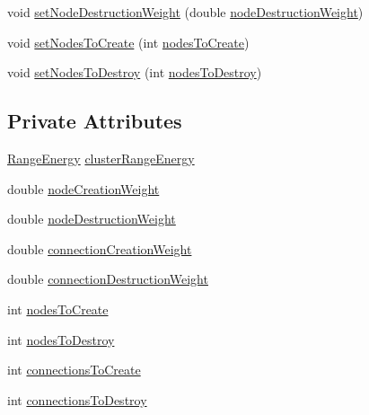 \begin{DoxyCompactItemize}
\item 
void \hyperlink{classcryomesh_1_1manipulators_1_1ClusterAnalysisData_a6bbc3f1089e480e644517c01e119cc56}{set\-Node\-Destruction\-Weight} (double \hyperlink{classcryomesh_1_1manipulators_1_1ClusterAnalysisData_ace52167d730c5513c9981a7be9a56499}{node\-Destruction\-Weight})
\item 
void \hyperlink{classcryomesh_1_1manipulators_1_1ClusterAnalysisData_a76000e1f7a03c3026f5e0c8c34cb655c}{set\-Nodes\-To\-Create} (int \hyperlink{classcryomesh_1_1manipulators_1_1ClusterAnalysisData_aa7100219ad6f168229ae1bea3b0f4c95}{nodes\-To\-Create})
\item 
void \hyperlink{classcryomesh_1_1manipulators_1_1ClusterAnalysisData_ae42bcf04427d1260b7c4210bff7dc109}{set\-Nodes\-To\-Destroy} (int \hyperlink{classcryomesh_1_1manipulators_1_1ClusterAnalysisData_afcdd6cf5b2a890ed24cce7ddf6855bd8}{nodes\-To\-Destroy})
\end{DoxyCompactItemize}
\subsection*{\-Private \-Attributes}
\begin{DoxyCompactItemize}
\item 
\hyperlink{structcryomesh_1_1manipulators_1_1ClusterAnalysisData_1_1RangeEnergy}{\-Range\-Energy} \hyperlink{classcryomesh_1_1manipulators_1_1ClusterAnalysisData_a2cc91850c86c1a09509266b639cbacdb}{cluster\-Range\-Energy}
\item 
double \hyperlink{classcryomesh_1_1manipulators_1_1ClusterAnalysisData_a135e912ae399505480429e488a163d75}{node\-Creation\-Weight}
\item 
double \hyperlink{classcryomesh_1_1manipulators_1_1ClusterAnalysisData_ace52167d730c5513c9981a7be9a56499}{node\-Destruction\-Weight}
\item 
double \hyperlink{classcryomesh_1_1manipulators_1_1ClusterAnalysisData_a25abb815b2869d410c9d32819471d67b}{connection\-Creation\-Weight}
\item 
double \hyperlink{classcryomesh_1_1manipulators_1_1ClusterAnalysisData_ac9f1a2eada7f214b62a257067ee7d336}{connection\-Destruction\-Weight}
\item 
int \hyperlink{classcryomesh_1_1manipulators_1_1ClusterAnalysisData_aa7100219ad6f168229ae1bea3b0f4c95}{nodes\-To\-Create}
\item 
int \hyperlink{classcryomesh_1_1manipulators_1_1ClusterAnalysisData_afcdd6cf5b2a890ed24cce7ddf6855bd8}{nodes\-To\-Destroy}
\item 
int \hyperlink{classcryomesh_1_1manipulators_1_1ClusterAnalysisData_add3ac0cb45a6782d3d92d9d4ea181609}{connections\-To\-Create}
\item 
int \hyperlink{classcryomesh_1_1manipulators_1_1ClusterAnalysisData_a303e9f1b0de641d8c3f79ff4ad05a9a5}{connections\-To\-Destroy}
\end{DoxyCompactItemize}
